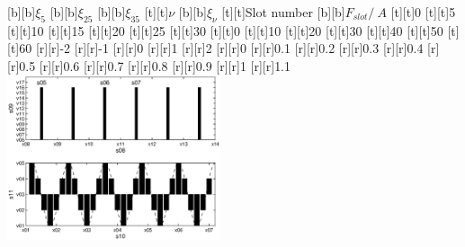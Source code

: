 %    
%
%
\begin{psfrags}%
\psfragscanon%
%
[b][b]{$\xi_{5}$}
[b][b]{$\xi_{25}$}
[b][b]{$\xi_{35}$}
[t][t]{$\nu$}
[b][b]{$\xi_{\nu}$}
[t][t]{Slot number}
[b][b]{$F_{slot}/\SI{}{A}$}
%
[t][t]{0}
[t][t]{5}
[t][t]{10}
[t][t]{15}
[t][t]{20}
[t][t]{25}
[t][t]{30}
[t][t]{0}
[t][t]{10}
[t][t]{20}
[t][t]{30}
[t][t]{40}
[t][t]{50}
[t][t]{60}
%
[r][r]{-2}
[r][r]{-1}
[r][r]{0}
[r][r]{1}
[r][r]{2}
[r][r]{0}
[r][r]{0.1}
[r][r]{0.2}
[r][r]{0.3}
[r][r]{0.4}
[r][r]{0.5}
[r][r]{0.6}
[r][r]{0.7}
[r][r]{0.8}
[r][r]{0.9}
[r][r]{1}
[r][r]{1.1}
%
\includegraphics[width=0.47\textwidth]{figs/f_Qs_30_p_5_2.eps}
\end{psfrags}%
%
